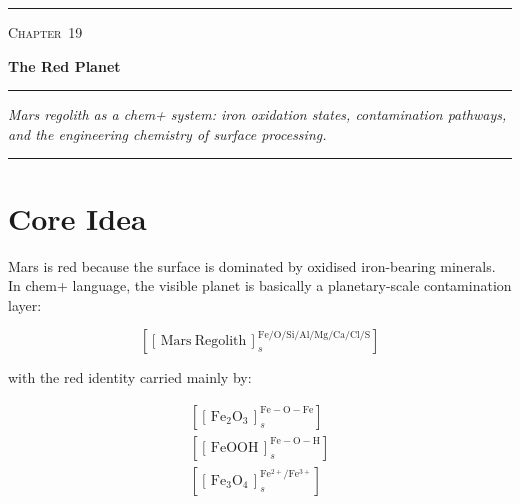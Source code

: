 \documentclass[11pt,a4paper]{article}
\newcommand{\cid}[3]{\!\left[\!\left[\,#1\,\right]^{\!#2}_{\!#3}\!\right]}
\begin{document}

\thispagestyle{plain}
\vspace*{0.6cm}

\begin{center}
  \noindent\rule{\textwidth}{1.2pt}\vspace{0.8em}

  {\small\scshape Chapter~19}\vspace{0.3em}

  {\fontsize{22}{28}\selectfont\bfseries The Red Planet}

  \vspace{0.5em}
  \noindent\rule{\textwidth}{0.5pt}\vspace{0.5em}

  {\itshape
	Mars regolith as a chem+ system: iron oxidation states,
	contamination pathways,\\[0.2em]
	and the engineering chemistry of surface processing.
  }
\end{center}

\vspace{1.0em}
\noindent\rule{\textwidth}{0.4pt}
\vspace{0.8em}

\tableofcontents
\newpage

\section{Core Idea}

Mars is red because the surface is dominated by oxidised iron-bearing minerals.
In chem+ language, the visible planet is basically a planetary-scale
contamination layer:

\[
\cid{\mathrm{Mars~Regolith}}
	{\mathrm{Fe/O/Si/Al/Mg/Ca/Cl/S}}
	{s}
\]

with the red identity carried mainly by:

\begin{gather*}
\cid{\mathrm{Fe_2O_3}}{\mathrm{Fe{-}O{-}Fe}}{s}\\[6pt]
\cid{\mathrm{FeOOH}}{\mathrm{Fe{-}O{-}H}}{s}\\[6pt]
\cid{\mathrm{Fe_3O_4}}{\mathrm{Fe^{2+}/Fe^{3+}}}{s}
\end{gather*}
\end{document}
